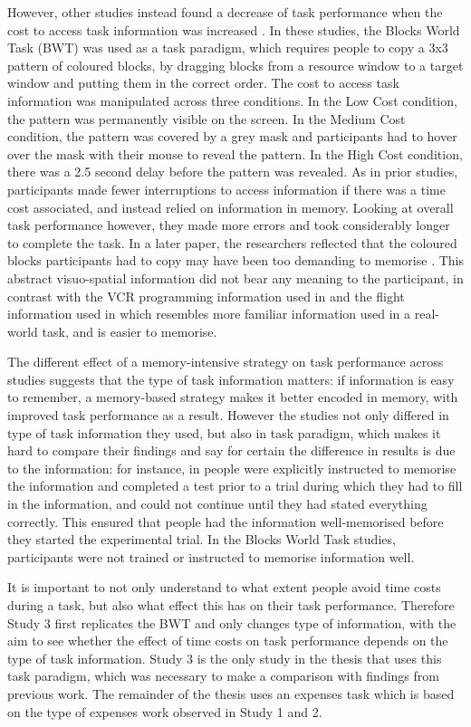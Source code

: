 However, other studies instead found a decrease of task performance when the cost to access task information was increased \citep{Gray2006, Morgan2009}. In these studies, the Blocks World Task (BWT) was used as a task paradigm, which requires people to copy a 3x3 pattern of coloured blocks, by dragging blocks from a resource window to a target window and putting them in the correct order. The cost to access task information was manipulated across three conditions. In the Low Cost condition, the pattern was permanently visible on the screen. In the Medium Cost condition, the pattern was covered by a grey mask and participants had to hover over the mask with their mouse to reveal the pattern. In the High Cost condition, there was a 2.5 second delay before the pattern was revealed. As in prior studies, participants made fewer interruptions to access information if there was a time cost associated, and instead relied on information in memory. Looking at overall task performance however, they made more errors and took considerably longer to complete the task. In a later paper, the researchers reflected that the coloured blocks participants had to copy may have been too demanding to memorise \citep{Waldron2011}. This abstract visuo-spatial information did not bear any meaning to the participant, in contrast with the VCR programming information used in \citet{Gray2004} and the flight information used in \citet{Waldron2007} which resembles more familiar information used in a real-world task, and is easier to memorise.

The different effect of a memory-intensive strategy on task performance across studies suggests that the type of task information matters: if information is easy to remember, a memory-based strategy makes it better encoded in memory, with improved task performance as a result. However the studies not only differed in type of task information they used, but also in task paradigm, which makes it hard to compare their findings and say for certain the difference in results is due to the information: for instance, in \citet{Gray2004} people were explicitly instructed to memorise the information and completed a test prior to a trial during which they had to fill in the information, and could not continue until they had stated everything correctly. This ensured that people had the information well-memorised before they started the experimental trial. In the Blocks World Task studies, participants were not trained or instructed to memorise information well.

It is important to not only understand to what extent people avoid time costs during a task, but also what effect this has on their task performance. Therefore Study 3 first replicates the BWT and only changes type of information, with the aim to see whether the effect of time costs on task performance depends on the type of task information. Study 3 is the only study in the thesis that uses this task paradigm, which was necessary to make a comparison with findings from previous work. The remainder of the thesis uses an expenses task which is based on the type of expenses work observed in Study 1 and 2. 

